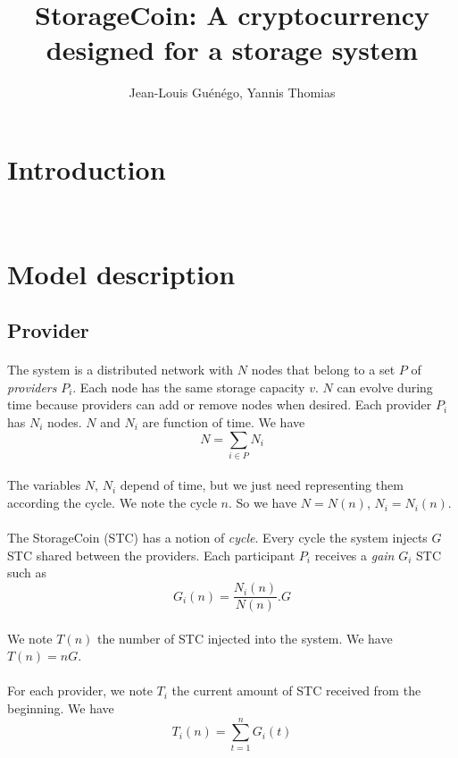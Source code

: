 \documentclass[a4paper,12pt]{article}
\title{StorageCoin: A cryptocurrency designed for a storage system}
\author{Jean-Louis Gu\'{e}n\'{e}go, Yannis Thomias}
\date{}
\begin{document}
\maketitle
\tableofcontents

\section{Introduction}
~\cite{bitcoin}
~\cite{peercoin}
~\cite{smallcell}

\section{Model description}
\subsection{Provider}

\paragraph*{}
The system is a distributed network with $N$ nodes that belong to a set $P$ of \emph{providers} $P_{i}$.
Each node has the same storage capacity $v$.
$N$ can evolve during time because providers can add or remove nodes  when desired. Each provider $P_{i}$ has $N_{i}$ nodes.
$N$ and $N_{i}$ are function of time. We have 
\[N=\sum\limits_{i\in{P}}N_{i}\]

\paragraph*{}
The variables $N$, $N_{i}$ depend of time, but we just need representing them according the cycle. We note the cycle $n$.
So we have $N=N(n)$, $N_{i}=N_{i}(n)$. 

\paragraph*{}
The StorageCoin (STC) has a notion of \emph{cycle}.
Every cycle the system injects $G$ STC shared between the providers.
Each participant $P_{i}$ receives a \emph{gain} $G_{i}$ STC such as
\[G_{i}(n)=\frac{N_{i}(n)}{N(n)}.G\]

\paragraph*{}
We note $T(n)$ the number of STC injected into the system. We have $T(n)=nG$.

\paragraph*{}
For each provider, we note $T_{i}$ the current amount of STC received from the beginning. We have
\[T_{i}(n)=\sum\limits_{t=1}^n G_{i}(t)\]
\end{document}
